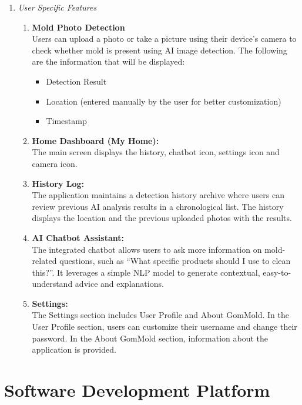 \documentclass[conference]{IEEEtran}
\begin{document}
\begin{enumerate}
    \item {\it User Specific Features}
        \begin{enumerate}[label=(\alph*)]
        \item {\bf Mold Photo Detection} \\
        Users can upload a photo or take a picture using their device's camera to check whether mold is present using AI image detection. The following are the information that will be displayed: 
            \begin{itemize}
             \item Detection Result 
             \item Location (entered manually by the user for better customization) 
             \item Timestamp
            \end{itemize}
        \item {\bf Home Dashboard (My Home):} \\
        The main screen displays the history, chatbot icon, settings icon and camera icon.
        \item {\bf History Log:} \\
        The application maintains a detection history archive where users can review previous AI analysis results in a chronological list. The history displays the location and the previous uploaded photos with the results. 
        \item {\bf AI Chatbot Assistant:} \\
        The integrated chatbot allows users to ask more information on mold-related questions, such as “What specific products should I use to clean this?”. It leverages a simple NLP model to generate contextual, easy-to-understand advice and explanations.  
        \item {\bf Settings:} \\
        The Settings section includes User Profile and About GomMold. In the User Profile section, users can customize their username and change their password. In the About GomMold section, information about the application is provided.
        \end{enumerate}
\end{enumerate}

\section{Software Development Platform}
\end{document}
